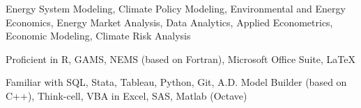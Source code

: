 


\begin{pubitems} %
    \item {Energy System Modeling, Climate Policy Modeling, Environmental and Energy Economics, Energy Market Analysis, Data Analytics, Applied Econometrics, Economic Modeling, Climate Risk Analysis}
\end{pubitems}



\begin{pubitems} %
    \item {Proficient in R, GAMS, NEMS (based on Fortran), Microsoft Office Suite, \LaTeX}
    \item {Familiar with SQL, Stata, Tableau, Python, Git, A.D. Model Builder (based on C++), Think-cell, VBA in Excel, SAS, Matlab (Octave)}
\end{pubitems}






